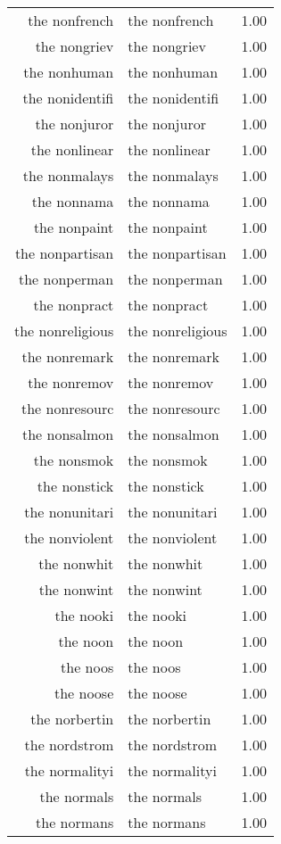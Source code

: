 \begin{table}[ht]
\begin{tabular}{rlr}
  the nonfrench & the nonfrench & 1.00 \\ 
  the nongriev & the nongriev & 1.00 \\ 
  the nonhuman & the nonhuman & 1.00 \\ 
  the nonidentifi & the nonidentifi & 1.00 \\ 
  the nonjuror & the nonjuror & 1.00 \\ 
  the nonlinear & the nonlinear & 1.00 \\ 
  the nonmalays & the nonmalays & 1.00 \\ 
  the nonnama & the nonnama & 1.00 \\ 
  the nonpaint & the nonpaint & 1.00 \\ 
  the nonpartisan & the nonpartisan & 1.00 \\ 
  the nonperman & the nonperman & 1.00 \\ 
  the nonpract & the nonpract & 1.00 \\ 
  the nonreligious & the nonreligious & 1.00 \\ 
  the nonremark & the nonremark & 1.00 \\ 
  the nonremov & the nonremov & 1.00 \\ 
  the nonresourc & the nonresourc & 1.00 \\ 
  the nonsalmon & the nonsalmon & 1.00 \\ 
  the nonsmok & the nonsmok & 1.00 \\ 
  the nonstick & the nonstick & 1.00 \\ 
  the nonunitari & the nonunitari & 1.00 \\ 
  the nonviolent & the nonviolent & 1.00 \\ 
  the nonwhit & the nonwhit & 1.00 \\ 
  the nonwint & the nonwint & 1.00 \\ 
  the nooki & the nooki & 1.00 \\ 
  the noon & the noon & 1.00 \\ 
  the noos & the noos & 1.00 \\ 
  the noose & the noose & 1.00 \\ 
  the norbertin & the norbertin & 1.00 \\ 
  the nordstrom & the nordstrom & 1.00 \\ 
  the normalityi & the normalityi & 1.00 \\ 
  the normals & the normals & 1.00 \\ 
  the normans & the normans & 1.00 \\ 

\end{tabular}
\end{table}
